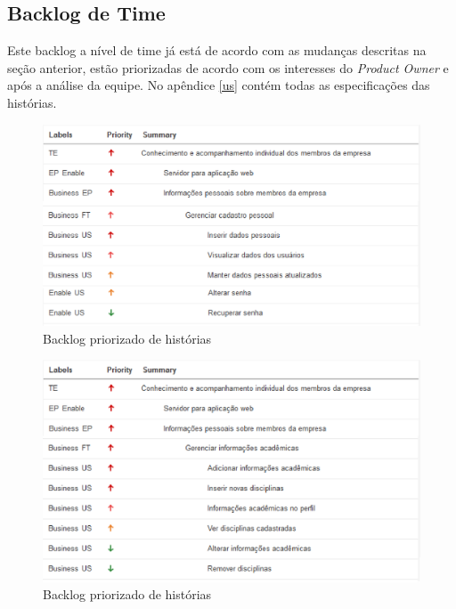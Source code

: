 \subsection{Backlog de Time}

    Este backlog a nível de time já está de acordo com as mudanças descritas na seção anterior, estão priorizadas de acordo com os interesses do \textit{Product Owner} e após a análise da equipe. No apêndice \ref{us} contém todas as especificações das histórias.

\begin{figure}[H]
    \centering
    \includegraphics[keepaspectratio=true,scale=0.6]{figuras/blus01.eps}
    \caption[Backlog história]{Backlog priorizado de histórias\label{backlogus01}}
\end{figure}

\begin{figure}[H]
    \centering
    \includegraphics[keepaspectratio=true,scale=0.6]{figuras/blus02.eps}
    \caption[Backlog história]{Backlog priorizado de histórias\label{backlogus02}}
\end{figure}

